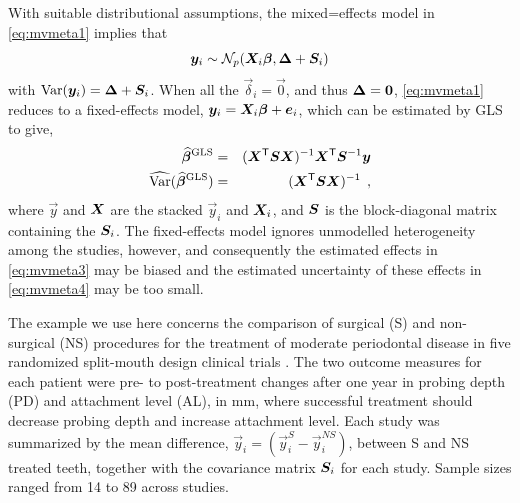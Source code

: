 With suitable distributional assumptions, the mixed=effects model in \eqref{eq:mvmeta1} implies that
\begin{equation}\label{eq:mvmeta2}
	\bm{y}_i \sim \mathcal{N}_p ( \bm{X}_i \bm{\beta}, \bm{\Delta} + \bm{S}_i)
\end{equation}
with $\mathrm{Var}(\bm{y}_i) = \bm{\Delta} + \bm{S}_i$. When all the
$\vec{\delta}_i = \vec{0}$, and thus $\bm{\Delta}=\bm{0}$,
\eqref{eq:mvmeta1} reduces to a fixed-effects model, $\bm{y}_i = \bm{X}_i \bm{\beta} + \bm{e}_i$,
which can be estimated by GLS to give,
\begin{eqnarray}
\widehat{\bm{\beta}}^{\textrm{GLS}} & = & (\bm{X}^\mathsf{T} \bm{S} \bm{X})^{-1} \bm{X}^\mathsf{T} \bm{S}^{-1} \bm{y} \label{eq:mvmeta3} \\
\widehat{\mathrm{Var}}(\widehat{\bm{\beta}}^{\textrm{GLS}}) & = & (\bm{X}^\mathsf{T} \bm{S} \bm{X})^{-1}  \label{eq:mvmeta4} \:\: ,
\end{eqnarray}
where $\vec{y}$ and $\bm{X}$ are the stacked $\vec{y}_i$ and $\bm{X}_i$, and
$\bm{S}$ is the block-diagonal matrix containing the $\bm{S}_i$.
The fixed-effects model ignores unmodelled heterogeneity among the studies, however,
and consequently the estimated effects in \eqref{eq:mvmeta3} may be biased and
the estimated uncertainty of these effects in \eqref{eq:mvmeta4} may be too small.

The example we use here concerns the comparison of surgical (S) and
non-surgical (NS) procedures for the treatment of moderate periodontal
disease in five randomized split-mouth design clinical trials
\citep{Antczak-Bouckoms-etal:1993,Berkey-etal:1998}.
The two outcome measures for each patient were pre- to post-treatment changes after one year
in probing depth (PD) and attachment level (AL), in mm, where successful treatment
should decrease probing depth and increase attachment level.
Each study was summarized by the mean difference, $\vec{y}_i = (\vec{y}_i^S - \vec{y}_i^{NS})$,
between S and NS treated teeth, together with the covariance matrix $\bm{S}_i$ for each study.
Sample sizes ranged from 14 to 89 across studies.

